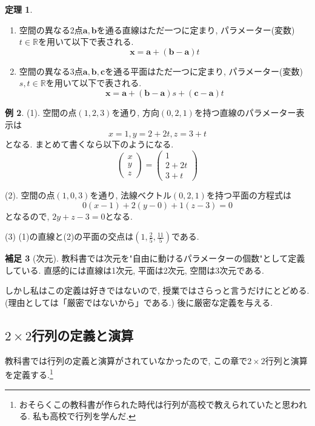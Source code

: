 \documentclass[dvipdfmx,a4paper,11pt]{article}
\newcommand{\R}{\mathbb{R}}
\theoremstyle{definition}
\newtheorem{thm}{定理}
\newtheorem{rem}[thm]{補足}
\newtheorem{exa}[thm]{例}
\begin{document}
\begin{tcolorbox}[
    colback = white,
    colframe = green!35!black,
    fonttitle = \bfseries,
    breakable = true]
    \begin{thm}\cite[定理1.1, 1.2]{M}
\begin{enumerate}
\setlength{\parskip}{0cm} 
\setlength{\itemsep}{0cm}
\item 空間の異なる2点$\bm{a}, \bm{b}$を通る直線はただ一つに定まり, パラメーター(変数)$t \in \R$を用いて以下で表される.
$$
\bm{x}
=
\bm{a} + (\bm{b} - \bm{a})t
$$
\item 空間の異なる3点$\bm{a}, \bm{b}, \bm{c}$を通る平面はただ一つに定まり, パラメーター(変数)$s, t \in \R$を用いて以下で表される.
$$
\bm{x}
=
\bm{a} + (\bm{b} - \bm{a})s +  (\bm{c} - \bm{a})t
$$
\end{enumerate}
\end{thm}
 \end{tcolorbox}
 
 
 \begin{exa}\cite[例題1.1, 1.2, 1.3]{M}
(1). 空間の点$(1,2,3)$を通り, 方向$(0,2,1)$を持つ直線のパラメーター表示は
$$
x=1, y=2+2t, z=3+t
$$
となる. まとめて書くなら以下のようになる. 
$$
\begin{pmatrix} x\\y\\z\end{pmatrix}
=
\begin{pmatrix} 1\\2+2t\\3+t\end{pmatrix}
$$

(2). 空間の点$(1,0,3)$を通り, 法線ベクトル$(0,2,1)$を持つ平面の方程式は
$$
0(x-1) + 2(y-0) + 1 (z-3)=0
$$
となるので, $2y + z-3=0$となる.

(3) (1)の直線と(2)の平面の交点は$(1, \frac{2}{5}, \frac{11}{5})$である. 
 \end{exa}
 
 \begin{rem}[次元]
 教科書では次元を"自由に動けるパラメーターの個数"として定義している.
 直感的には直線は1次元, 平面は2次元, 空間は3次元である.
 
 しかし私はこの定義は好きではないので, 授業ではさらっと言うだけにとどめる. 
(理由としては「厳密ではないから」である.)
後に厳密な定義を与える.  
 \end{rem}

 
 \subsection{$2\times 2$行列の定義と演算}
 教科書では行列の定義と演算がされていなかったので, この章で$2\times 2$行列と演算を定義する.\footnote{おそらくこの教科書が作られた時代は行列が高校で教えられていたと思われる. 私も高校で行列を学んだ. } 
 
\end{document}
